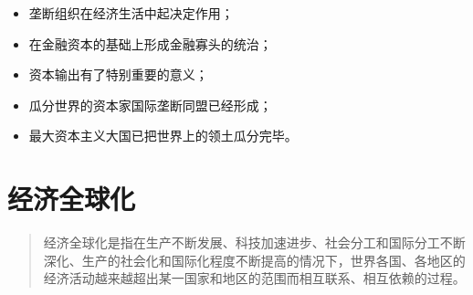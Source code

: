 \documentclass[
]{article}
\begin{document}
\begin{itemize}
\item
  垄断组织在经济生活中起决定作用；
\item
  在金融资本的基础上形成金融寡头的统治；
\item
  资本输出有了特别重要的意义；
\item
  瓜分世界的资本家国际垄断同盟已经形成；
\item
  最大资本主义大国已把世界上的领土瓜分完毕。
\end{itemize}

\hypertarget{ux7ecfux6d4eux5168ux7403ux5316}{%
\section{经济全球化}\label{ux7ecfux6d4eux5168ux7403ux5316}}

\begin{quote}
经济全球化是指在生产不断发展、科技加速进步、社会分工和国际分工不断深化、生产的社会化和国际化程度不断提高的情况下，世界各国、各地区的经济活动越来越超出某一国家和地区的范围而相互联系、相互依赖的过程。
\end{quote}
\end{document}
